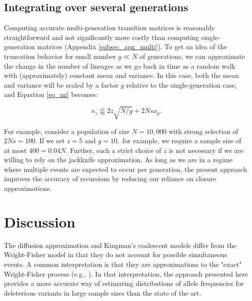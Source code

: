 \documentclass[review,nonatbib]{elsarticle}
\begin{document}
\subsection{Integrating over several generations}

Computing accurate multi-generation transition matrices is reasonably straightforward
and not significantly more costly than computing single-generation matrices
(Appendix \ref{subsec_apx_multi}). To get an idea of the truncation behavior
for small number $g \ll N$ of generations, we can approximate the change  in the number
of lineages as we go back in time as a random walk with (approximately) constant mean and
variance. In this case, both the mean and variance will be scaled by a factor $g$ relative
to the single-generation case, and Equation \eqref{eq_nz} becomes:

\begin{equation}
  n_z \lessapprox 2 z\sqrt{N/g} + 2N s x_p.
\label{eq_nzg}
\end{equation}

For example, consider a population of size $N=10,000$ with strong selection
of $2Ns = 100.$ 
 If we set $z=5$ and $g=10,$ for example, we require a sample size of at most $ 400 = 0.04 N.$
Further, such a strict choice of $z$ is not necessary if we are willing to rely on the jackknife approximation.
As long as we are in a regime where multiple events are expected to occur per generation, 
the present approach improves the accuracy of recursions by reducing our reliance on closure approximations.  

\section{Discussion}
\label{sec_conclusion}


The diffusion approximation and Kingman's coalescent models differ from 
the Wright-Fisher model in that they do not account for possible simultaneous events. 
A common interpretation is that they are approximations to the 
"exact" Wright-Fisher process (e.g., \cite{Fu2006}). In that interpretation, the approach presented here 
provides a more accurate way of estimating distributions of allele frequencies for deleterious variants 
in large sample sizes than the state of the art. 
\end{document}
